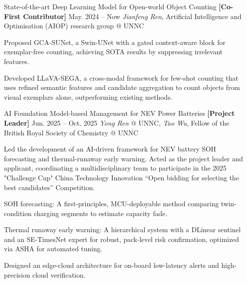 
    
    \item[\raisebox{0.3ex}{\textbullet}]
    \resumeResearchExperience
      {State-of-the-art Deep Learning Model for Open-world Object Counting}
      {\textbf{[Co-First Contributor]} May. 2024 -- Now}
      {\textit{Jianfeng Ren}, Artificial Intelligence and Optimisation (AIOP) research group @ UNNC}
      {
        Proposed GCA-SUNet, a Swin-UNet with a gated context-aware block for exemplar-free counting, achieving SOTA results by suppressing irrelevant features. \\
        \item Developed LLaVA-SEGA, a cross-modal framework for few-shot counting that uses refined semantic features and candidate aggregation to count objects from visual exemplars alone, outperforming existing methods.
    }


    \item[\raisebox{0.3ex}{\textbullet}]
    \resumeResearchExperience
      {AI Foundation Model-based Management for NEV Power Batteries}
      {\textbf{[Project Leader]} Jun. 2025 -- Oct. 2025}
      {\textit{Yong Ren} @ UNNC, \textit{Tao Wu}, Fellow of the British Royal Society of Chemistry @ UNNC}
      {
        Led the development of an AI-driven framework for NEV battery SOH forecasting and thermal-runaway early warning. Acted as the project leader and applicant, coordinating a multidisciplinary team to participate in the 2025 "Challenge Cup" China Technology Innovation “Open bidding for selecting the best candidates” Competition. \\
        \item SOH forecasting: A first-principles, MCU-deployable method comparing twin-condition charging segments to estimate capacity fade.
        \item Thermal runaway early warning: A hierarchical system with a DLinear sentinel and an SE-TimesNet expert for robust, pack-level risk confirmation, optimized via ASHA for automated tuning.
        \item Designed an edge-cloud architecture for on-board low-latency alerts and high-precision cloud verification.
      }



